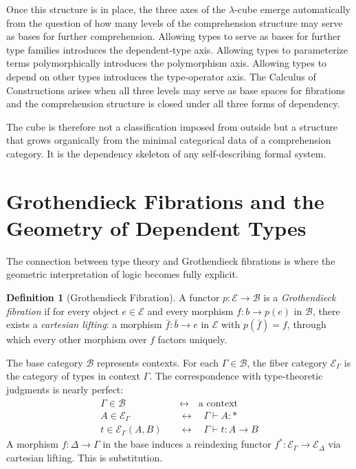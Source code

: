 \documentclass[12pt,a4paper]{article}
\theoremstyle{plain}
\theoremstyle{definition}
\newtheorem{definition}[theorem]{Definition}
\newcommand{\E}{\mathcal{E}}
\newcommand{\B}{\mathcal{B}}
\begin{document}
Once this structure is in place, the three axes of the $\lambda$-cube emerge
automatically from the question of how many levels of the comprehension
structure may serve as bases for further comprehension. Allowing types to serve
as bases for further type families introduces the dependent-type axis. Allowing
types to parameterize terms polymorphically introduces the polymorphism axis.
Allowing types to depend on other types introduces the type-operator axis. The
Calculus of Constructions arises when all three levels may serve as base spaces
for fibrations and the comprehension structure is closed under all three forms
of dependency.

The cube is therefore not a classification imposed from outside but a structure
that grows organically from the minimal categorical data of a comprehension
category. It is the dependency skeleton of any self-describing formal system.

\section{Grothendieck Fibrations and the Geometry of Dependent Types}

The connection between type theory and Grothendieck fibrations is where the
geometric interpretation of logic becomes fully explicit.

\begin{definition}[Grothendieck Fibration]
A functor $p : \E \to \B$ is a \emph{Grothendieck fibration} if for every
object $e \in \E$ and every morphism $f : b \to p(e)$ in $\B$, there exists a
\emph{cartesian lifting}: a morphism $\bar f : \bar b \to e$ in $\E$ with
$p(\bar f) = f$, through which every other morphism over $f$ factors uniquely.
\end{definition}

The base category $\B$ represents contexts. For each $\Gamma \in \B$, the
fiber category $\E_\Gamma$ is the category of types in context $\Gamma$. The
correspondence with type-theoretic judgments is nearly perfect:
\begin{align*}
\Gamma \in \B \quad &\longleftrightarrow \quad \text{a context} \\[2pt]
A \in \E_\Gamma \quad &\longleftrightarrow \quad \Gamma \vdash A : * \\[2pt]
t \in \E_\Gamma(A, B) \quad &\longleftrightarrow \quad \Gamma \vdash t : A \to B
\end{align*}
A morphism $f : \Delta \to \Gamma$ in the base induces a reindexing functor
$f^* : \E_\Gamma \to \E_\Delta$ via cartesian lifting. This is substitution.
\end{document}

